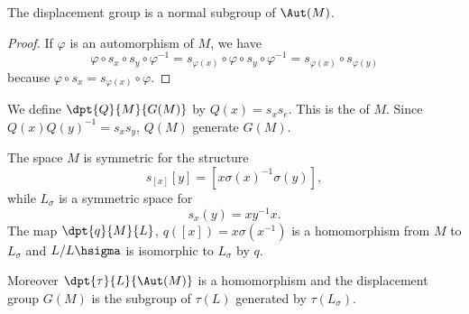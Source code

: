\begin{lemma}
The displacement group is a normal subgroup of $\Aut(M)$.
\end{lemma}

\begin{proof}
If $\varphi$ is an automorphism of $M$, we have
\begin{equation}
  \varphi\circ s_x\circ s_y\circ\varphi^{-1}=s_{\varphi(x)}\circ\varphi\circ s_y\circ\varphi^{-1}
                                   =s_{\varphi(x)}\circ s_{\varphi(y)}
\end{equation}
  because $\varphi\circ s_{x}=s_{\varphi(x)}\circ\varphi$.
\end{proof}


We define $\dpt{Q}{M}{G(M)}$ by $Q(x)=s_xs_e$. This is the  of $M$. Since $Q(x)Q(y)^{-1}=s_xs_y$, $Q(M)$ generate $G(M)$.

\begin{theorem}		\label{ThoStructSymGH}\label{tho:sym_homo}
	The space $M$ is symmetric for the structure
	\begin{equation}\label{eq:sym_M}
		s_{[x]}[y]=[x\sigma(x)^{-1}\sigma(y)],
	\end{equation}
	while $L_{\sigma}$ is a symmetric space for
	\begin{equation}
		s_x(y)=xy^{-1} x.
	\end{equation}
	The map $\dpt{q}{M}{L}$, $q([x])=x\sigma(x^{-1})$ is a homomorphism from $M$ to $L_{\sigma}$ and $L/L\hsigma$ is isomorphic to $L_{\sigma}$ by $q$.

	Moreover $\dpt{\tau}{L}{\Aut(M)}$ is a homomorphism and the displacement group $G(M)$ is the subgroup of $\tau(L)$ generated by $\tau(L_{\sigma})$.

\end{theorem}

